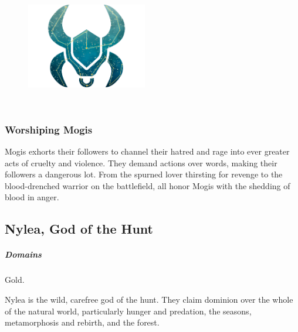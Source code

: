     \begin{figure}[b]
        \centering
        \includegraphics[width=0.47\textwidth]{02viphoger/img/10s_mogis.png}
    \end{figure}

    \pagebreak~
    \vspace{14.0cm}

    \subsubsection{Worshiping Mogis}
        Mogis exhorts their followers to channel their hatred and rage into ever greater acts of cruelty and violence.
        They demand actions over words, making their followers a dangerous lot.
        From the spurned lover thirsting for revenge to the blood-drenched warrior on the battlefield, all honor Mogis with the shedding of blood in anger.


\subsection*{Nylea, God of the Hunt} \label{ssec::nylea}
    \subparagraph{Domains} Gold.

    Nylea is the wild, carefree god of the hunt.
    They claim dominion over the whole of the natural world, particularly hunger and predation, the seasons, metamorphosis and rebirth, and the forest.


